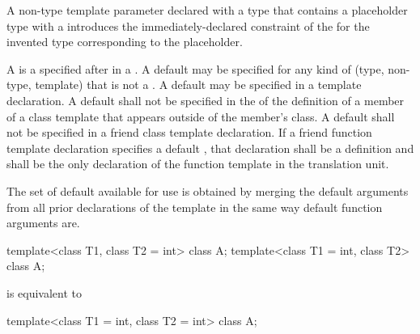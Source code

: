 \pnum
A non-type template parameter declared with a type that
contains a placeholder type with a 
introduces the immediately-declared constraint
of the 
for the invented type corresponding to the placeholder.

\pnum
A
is a
 specified after
\tcode{=}
in a
.
A default
may be specified for any kind of
(type, non-type, template)
that is not a .
A default
may be specified in a template declaration.
A default
shall not be specified in the
of the definition of a member of a class template that appears outside
of the member's class.
A default
shall not be specified in a friend class template declaration.
If a friend function template declaration
specifies a default
,
that declaration shall be a definition and shall be the only declaration of
the function template in the translation unit.

\pnum
The set of default
available for use is obtained by merging the default arguments
from all prior declarations of the template in the
same way default function arguments are.
\begin{example}
\begin{codeblock}
template<class T1, class T2 = int> class A;
template<class T1 = int, class T2> class A;
\end{codeblock}
is equivalent to
\begin{codeblock}
template<class T1 = int, class T2 = int> class A;
\end{codeblock}
\end{example}

